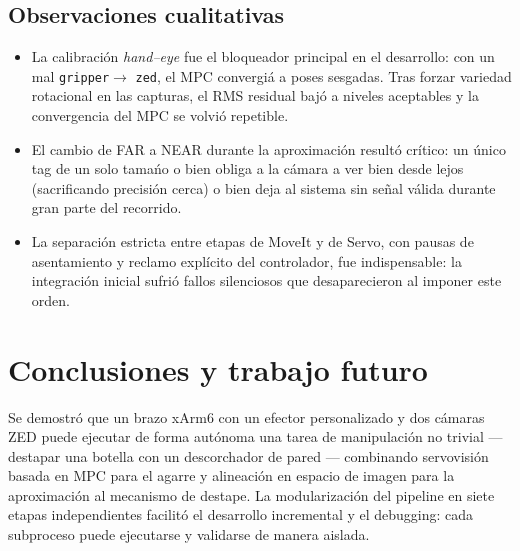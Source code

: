 \documentclass[conference]{IEEEtran}
\begin{document}
\subsection{Observaciones cualitativas}

\begin{itemize}
  \item La calibraci\'on \emph{hand--eye} fue el bloqueador
        principal en el desarrollo: con un mal \texttt{gripper}$\rightarrow$%
        \texttt{zed}, el MPC convergi\'a a poses sesgadas. Tras
        forzar variedad rotacional en las capturas, el RMS residual
        baj\'o a niveles aceptables y la convergencia del MPC se
        volvi\'o repetible.
  \item El cambio de FAR a NEAR durante la aproximaci\'on result\'o
        cr\'itico: un \'unico tag de un solo tama\'no o bien obliga a
        la c\'amara a ver bien desde lejos (sacrificando precisi\'on
        cerca) o bien deja al sistema sin se\~nal v\'alida durante
        gran parte del recorrido.
  \item La separaci\'on estricta entre etapas de MoveIt y de Servo,
        con pausas de asentamiento y reclamo expl\'icito del
        controlador, fue indispensable: la integraci\'on inicial
        sufri\'o fallos silenciosos que desaparecieron al imponer
        este orden.
\end{itemize}

\section{Conclusiones y trabajo futuro}

Se demostr\'o que un brazo xArm6 con un efector personalizado y dos
c\'amaras ZED puede ejecutar de forma aut\'onoma una tarea de
manipulaci\'on no trivial --- destapar una botella con un descorchador
de pared --- combinando servovisi\'on basada en MPC para el agarre y
alineaci\'on en espacio de imagen para la aproximaci\'on al mecanismo
de destape. La modularizaci\'on del pipeline en siete etapas
independientes facilit\'o el desarrollo incremental y el debugging:
cada subproceso puede ejecutarse y validarse de manera aislada.
\end{document}
